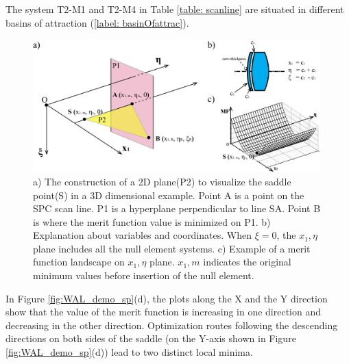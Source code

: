 The system T2-M1 and T2-M4 in Table \ref{table: scanline} are situated in different basins of attraction (\ref{label: basinOfattrac}).  

\begin{figure}[h!]
    \centering
    \includegraphics[width=0.985\textwidth]{chapter-4/figures/hyperplane.png}
    \caption{ a) The construction of a 2D plane(P2) to visualize the saddle point(S) in a 3D dimensional example. Point A is a point on the SPC scan line. P1 is a hyperplane perpendicular to line SA. Point B is where the merit function value is minimized on P1. b) Explanation about variables and coordinates. When $\xi = 0$, the $x_1, \eta$ plane includes all the null element systems. c) Example of a merit function landscape on  $x_1, \eta$  plane. $x_1,m$ indicates the original minimum values before insertion of the null element.}
    \label{fig:hyperplane}
\end{figure}
In Figure \ref{fig:WAL_demo_sp}(d), the plots along the X and the Y direction show that the value of the merit function is increasing in one direction and decreasing in the other direction. Optimization routes following the descending directions on both sides of the saddle (on the Y-axis shown in Figure \ref{fig:WAL_demo_sp}(d)) lead to two distinct local minima.

